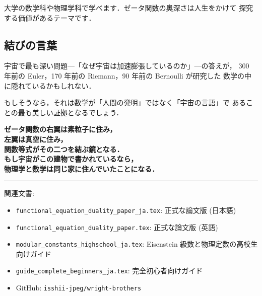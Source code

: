 \documentclass[11pt,a4paper]{article}
\begin{document}
大学の数学科や物理学科で学べます．ゼータ関数の奥深さは人生をかけて
探究する価値があるテーマです．

\subsection{結びの言葉}

宇宙で最も深い問題---「なぜ宇宙は加速膨張しているのか」---の答えが，
300 年前の Euler，170 年前の Riemann，90 年前の Bernoulli が研究した
数学の中に隠れているかもしれない．

もしそうなら，それは数学が「人間の発明」ではなく「宇宙の言語」で
あることの最も美しい証拠となるでしょう．

\vspace{2em}
\begin{center}
\Large
\textbf{ゼータ関数の右翼は素粒子に住み，\\
左翼は真空に住み，\\
関数等式がその二つを結ぶ鏡となる．\\[0.5em]
もし宇宙がこの建物で書かれているなら，\\
物理学と数学は同じ家に住んでいたことになる．}
\end{center}

\vspace{2em}
\hrule
\vspace{0.5em}
\small
\noindent
関連文書:
\begin{itemize}
\item \texttt{functional\_equation\_duality\_paper\_ja.tex}: 正式な論文版 (日本語)
\item \texttt{functional\_equation\_duality\_paper.tex}: 正式な論文版 (英語)
\item \texttt{modular\_constants\_highschool\_ja.tex}: Eisenstein 級数と物理定数の高校生向けガイド
\item \texttt{guide\_complete\_beginners\_ja.tex}: 完全初心者向けガイド
\item GitHub: \texttt{isshii-jpeg/wright-brothers}
\end{itemize}
\end{document}
